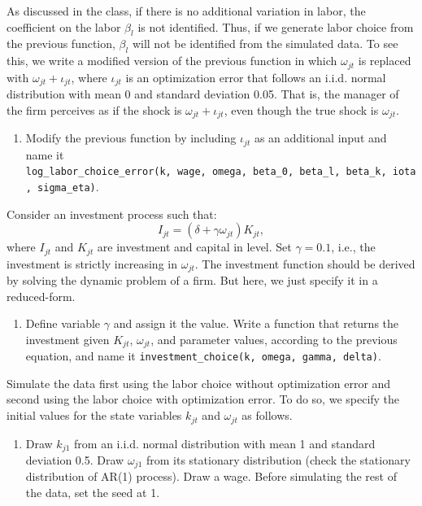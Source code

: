 \documentclass[
]{book}
\providecommand{\tightlist}{%
  \setlength{\itemsep}{0pt}\setlength{\parskip}{0pt}}
\begin{document}
As discussed in the class, if there is no additional variation in labor, the coefficient on the labor \(\beta_l\) is not identified. Thus, if we generate labor choice from the previous function, \(\beta_l\) will not be identified from the simulated data. To see this, we write a modified version of the previous function in which \(\omega_{jt}\) is replaced with \(\omega_{jt} + \iota_{jt}\), where \(\iota_{jt}\) is an optimization error that follows an i.i.d. normal distribution with mean 0 and standard deviation 0.05. That is, the manager of the firm perceives as if the shock is \(\omega_{jt} + \iota_{jt}\), even though the true shock is \(\omega_{jt}\).

\begin{enumerate}
\def\labelenumi{\arabic{enumi}.}
\setcounter{enumi}{3}
\tightlist
\item
  Modify the previous function by including \(\iota_{jt}\) as an additional input and name it \texttt{log\_labor\_choice\_error(k,\ wage,\ omega,\ beta\_0,\ beta\_l,\ beta\_k,\ iota,\ sigma\_eta)}.
\end{enumerate}

Consider an investment process such that:
\[
I_{jt} = (\delta + \gamma \omega_{jt}) K_{jt},
\]
where \(I_{jt}\) and \(K_{jt}\) are investment and capital in level. Set \(\gamma = 0.1\), i.e., the investment is strictly increasing in \(\omega_{jt}\). The investment function should be derived by solving the dynamic problem of a firm. But here, we just specify it in a reduced-form.

\begin{enumerate}
\def\labelenumi{\arabic{enumi}.}
\setcounter{enumi}{4}
\tightlist
\item
  Define variable \(\gamma\) and assign it the value. Write a function that returns the investment given \(K_{jt}\), \(\omega_{jt}\), and parameter values, according to the previous equation, and name it \texttt{investment\_choice(k,\ omega,\ gamma,\ delta)}.
\end{enumerate}

Simulate the data first using the labor choice without optimization error and second using the labor choice with optimization error. To do so, we specify the initial values for the state variables \(k_{jt}\) and \(\omega_{jt}\) as follows.

\begin{enumerate}
\def\labelenumi{\arabic{enumi}.}
\setcounter{enumi}{5}
\tightlist
\item
  Draw \(k_{j1}\) from an i.i.d. normal distribution with mean 1 and standard deviation 0.5. Draw \(\omega_{j1}\) from its stationary distribution (check the stationary distribution of AR(1) process). Draw a wage. Before simulating the rest of the data, set the seed at 1.
\end{enumerate}
\end{document}
